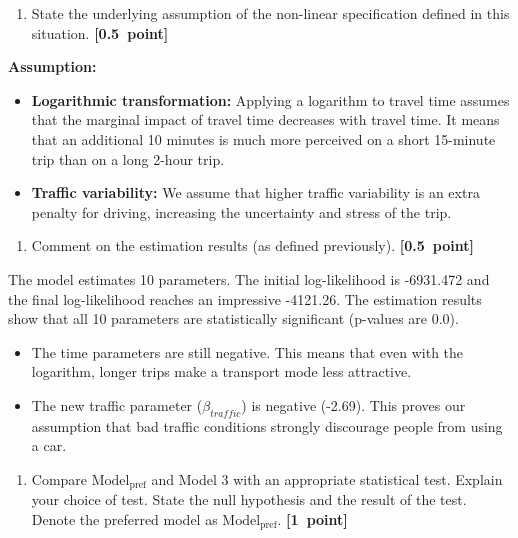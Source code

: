 \documentclass[11pt,a4paper]{article}
\begin{document}


\begin{enumerate}
	\item State the underlying assumption of the non-linear specification defined in this situation. \textbf{[0.5~point]}
\end{enumerate}

\begin{minipage}{\textwidth}
\textbf{ Assumption:}
\begin{itemize}
    \item \textbf{Logarithmic transformation:} Applying a logarithm to travel time assumes that the marginal impact of travel time decreases with travel time. It means that an additional 10 minutes is much more perceived on a short 15-minute trip than on a long 2-hour trip.
    \item \textbf{Traffic variability:} We assume that higher traffic variability is an extra penalty for driving, increasing the uncertainty and stress of the trip.
\end{itemize}
\end{minipage}

\begin{enumerate}[resume]
	\item Comment on the estimation results (as defined previously). \textbf{[0.5~point]}
\end{enumerate}

The model estimates 10 parameters. The initial log-likelihood is -6931.472 and the final log-likelihood reaches an impressive -4121.26. 
The estimation results show that all 10 parameters are statistically significant (p-values are 0.0). 
\begin{itemize}
    \item The time parameters are still negative. This means that even with the logarithm, longer trips make a transport mode less attractive.
    \item The new traffic parameter ($\beta_{traffic}$) is negative (-2.69). This proves our assumption that bad traffic conditions strongly discourage people from using a car.
\end{itemize}


\begin{enumerate}[resume]
	\item Compare $\text{Model}_\text{pref}$ and Model 3 with an appropriate statistical test. Explain your choice of test. State the null hypothesis and the result of the test. Denote the preferred model as $\text{Model}_\text{pref}$. \textbf{[1~point]}
\end{enumerate}
\end{document}
